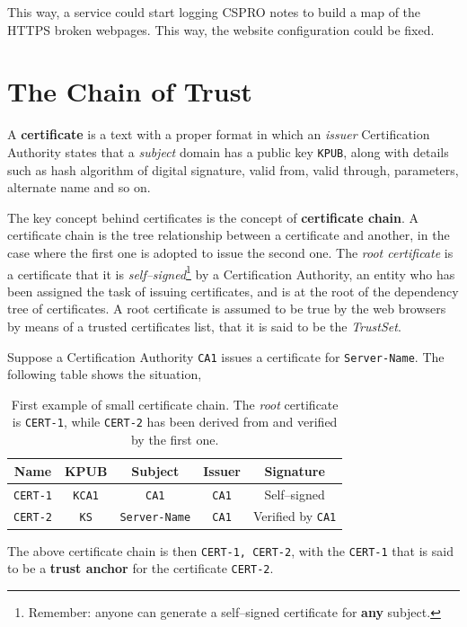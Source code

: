 \documentclass[10pt]{extbook}
\begin{document}
This way, a service could start logging CSPRO notes to build a map of the
HTTPS broken webpages. This way, the website configuration could be fixed.

\section{The Chain of Trust}

A \textbf{certificate} is a text with a proper format in which an \emph{issuer}
Certification Authority states that a \emph{subject} domain has a public key
\texttt{KPUB}, along with details such as hash algorithm of digital signature,
valid from, valid through, parameters, alternate name and so on.

The key concept behind certificates is the concept of \textbf{certificate
chain}. A certificate chain is the tree relationship between a certificate and
another, in the case where the first one is adopted to issue the second one.
The \emph{root certificate} is a certificate that it is
\emph{self--signed}\footnote{Remember: anyone can generate a self--signed certificate
for \textbf{any} subject.} by a Certification Authority, an entity who has been
assigned the task of issuing certificates, and is at the root of the dependency
tree of certificates. A root certificate is assumed to be true by the web
browsers by means of a trusted certificates list, that it is said to be the
\emph{TrustSet}.

Suppose a Certification Authority \texttt{CA1} issues a certificate for
\texttt{Server\--Name}. The following table shows the situation,
\begin{table}[ht]
\centering
\begin{tabular}{ccccc}
    \textbf{Name} & \textbf{KPUB} & \textbf{Subject} & \textbf{Issuer} & \textbf{Signature} \\
    \hline
    \texttt{CERT-1} & \texttt{KCA1} & \texttt{CA1} & \texttt{CA1} & Self--signed \\
    \texttt{CERT-2} & \texttt{KS} & \texttt{Server-Name} & \texttt{CA1} & Verified by \texttt{CA1}
\end{tabular}
\caption{First example of small certificate chain. The \emph{root} certificate
    is \texttt{CERT-1}, while \texttt{CERT-2} has been derived from and
    verified by the first one.}\label{tab:certificateChain1}
\end{table}
\bigskip

The above certificate chain is then \texttt{CERT-1, CERT-2}, with the
\texttt{CERT-1} that is said to be a \textbf{trust anchor} for the certificate
\texttt{CERT-2}.
\end{document}
